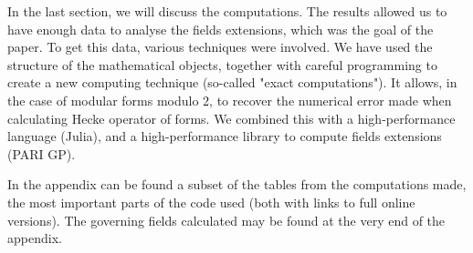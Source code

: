 In the last section, we will discuss the computations.
The results allowed us to have enough data to analyse the fields extensions, which was the goal of the paper.
To get this data, various techniques were involved.
We have used the structure of the mathematical objects, together with careful programming to create a new computing technique (so-called "exact computations").
It allows, in the case of modular forms modulo 2, to recover the numerical error made when calculating Hecke operator of forms.
We combined this with a high-performance language (Julia), and a high-performance library to compute fields extensions (PARI GP).

In the appendix can be found a subset of the tables from the computations made, the most important parts of the code used (both with links to full online versions).
The governing fields calculated may be found at the very end of the appendix.
